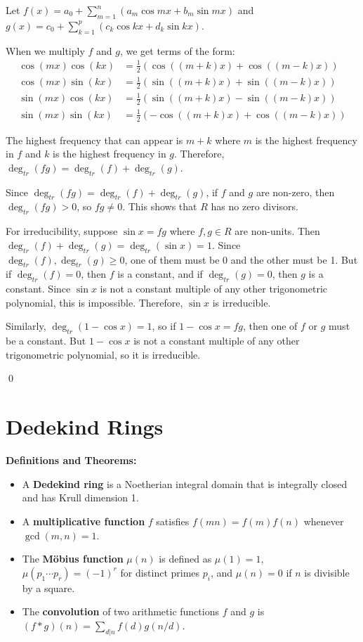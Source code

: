 Let $f(x) = a_0 + \sum_{m=1}^n (a_m \cos mx + b_m \sin mx)$ and $g(x) = c_0 + \sum_{k=1}^p (c_k \cos kx + d_k \sin kx)$.

When we multiply $f$ and $g$, we get terms of the form:
\begin{align*}
\cos(mx) \cos(kx) &= \frac{1}{2}(\cos((m+k)x) + \cos((m-k)x)) \\
\cos(mx) \sin(kx) &= \frac{1}{2}(\sin((m+k)x) + \sin((m-k)x)) \\
\sin(mx) \cos(kx) &= \frac{1}{2}(\sin((m+k)x) - \sin((m-k)x)) \\
\sin(mx) \sin(kx) &= \frac{1}{2}(-\cos((m+k)x) + \cos((m-k)x))
\end{align*}

The highest frequency that can appear is $m + k$ where $m$ is the highest frequency in $f$ and $k$ is the highest frequency in $g$. Therefore, $\deg_{tr}(fg) = \deg_{tr}(f) + \deg_{tr}(g)$.

Since $\deg_{tr}(fg) = \deg_{tr}(f) + \deg_{tr}(g)$, if $f$ and $g$ are non-zero, then $\deg_{tr}(fg) > 0$, so $fg \neq 0$. This shows that $R$ has no zero divisors.

For irreducibility, suppose $\sin x = fg$ where $f, g \in R$ are non-units. Then $\deg_{tr}(f) + \deg_{tr}(g) = \deg_{tr}(\sin x) = 1$. Since $\deg_{tr}(f), \deg_{tr}(g) \geq 0$, one of them must be 0 and the other must be 1. But if $\deg_{tr}(f) = 0$, then $f$ is a constant, and if $\deg_{tr}(g) = 0$, then $g$ is a constant. Since $\sin x$ is not a constant multiple of any other trigonometric polynomial, this is impossible. Therefore, $\sin x$ is irreducible.

Similarly, $\deg_{tr}(1 - \cos x) = 1$, so if $1 - \cos x = fg$, then one of $f$ or $g$ must be a constant. But $1 - \cos x$ is not a constant multiple of any other trigonometric polynomial, so it is irreducible.


\qed
\section{Dedekind Rings}

\noindent\textbf{Definitions and Theorems:}
\begin{itemize}
\item A \textbf{Dedekind ring} is a Noetherian integral domain that is integrally closed and has Krull dimension 1.
\item A \textbf{multiplicative function} $f$ satisfies $f(mn) = f(m)f(n)$ whenever $\gcd(m,n) = 1$.
\item The \textbf{M\"obius function} $\mu(n)$ is defined as $\mu(1) = 1$, $\mu(p_1 \cdots p_r) = (-1)^r$ for distinct primes $p_i$, and $\mu(n) = 0$ if $n$ is divisible by a square.
\item The \textbf{convolution} of two arithmetic functions $f$ and $g$ is $(f * g)(n) = \sum_{d|n} f(d)g(n/d)$.
\end{itemize}

